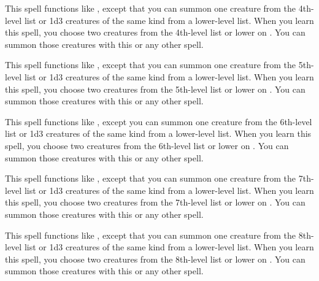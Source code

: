 \spelldur{\durshort \dismissable}
\spellline
\spelleffect This spell functions like , except that you can summon one creature from the 4th-level list or 1d3 creatures of the same kind from a lower-level list. When you learn this spell, you choose two creatures from the 4th-level list or lower on . You can summon those creatures with this or any other  spell.

\spelldur{\durshort \dismissable}
\spellline
\spelleffect This spell functions like , except that you can summon one creature from the 5th-level list or 1d3 creatures of the same kind from a lower-level list. When you learn this spell, you choose two creatures from the 5th-level list or lower on . You can summon those creatures with this or any other  spell.

\spelldur{\durshort \dismissable}
\spellline
\spelleffect This spell functions like , except you can summon one creature from the 6th-level list or 1d3 creatures of the same kind from a lower-level list. When you learn this spell, you choose two creatures from the 6th-level list or lower on . You can summon those creatures with this or any other  spell.

\spelldur{\durshort \dismissable}
\spellline
\spelleffect This spell functions like , except that you can summon one creature from the 7th-level list or 1d3 creatures of the same kind from a lower-level list. When you learn this spell, you choose two creatures from the 7th-level list or lower on . You can summon those creatures with this or any other  spell.

\spelldur{\durshort \dismissable}
\spellline
\spelleffect This spell functions like , except that you can summon one creature from the 8th-level list or 1d3 creatures of the same kind from a lower-level list. When you learn this spell, you choose two creatures from the 8th-level list or lower on . You can summon those creatures with this or any other  spell.

